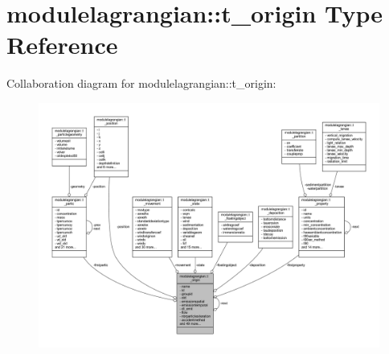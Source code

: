 \hypertarget{structmodulelagrangian_1_1t__origin}{}\section{modulelagrangian\+:\+:t\+\_\+origin Type Reference}
\label{structmodulelagrangian_1_1t__origin}


Collaboration diagram for modulelagrangian\+:\+:t\+\_\+origin\+:\nopagebreak
\begin{figure}[H]
\begin{center}
\leavevmode
\includegraphics[width=350pt]{structmodulelagrangian_1_1t__origin__coll__graph}
\end{center}
\end{figure}
